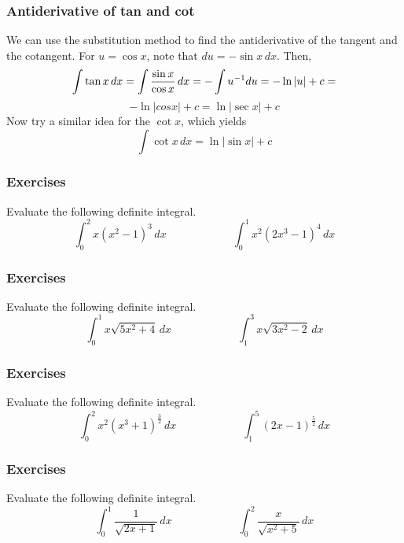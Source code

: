 \documentclass[xcolor=dvipsnames]{beamer}
\begin{document}
\begin{frame}
  \frametitle{Antiderivative of tan and cot}
We can use the substitution method to find the antiderivative of the
tangent and the cotangent. For $u=\cos{}x$, note that
$du=-\sin{}x\,dx$. Then,
\begin{equation}
  \label{eq:aibeajuh}
  \int\tan{}x\,dx=\int\frac{\sin{}x}{\cos{}x}\,dx=-\int{}u^{-1}du=-\ln{}|u|+c=\notag
\end{equation}
\begin{equation}
  \label{eq:eeroteda}
-\ln|cos{}x|+c=\ln|\sec{}x|+c
\end{equation}
Now try a similar idea for the $\cot{}x$, which yields
\begin{equation}
  \label{eq:eekahchi}
  \int{}\cot{}x\,dx=\ln|\sin{}x|+c
\end{equation}
\end{frame}


\begin{frame}
  \frametitle{Exercises}
{\ubung} Evaluate the following definite integral.
\begin{equation}
  \label{eq:mauphouw}
  \int_{0}^{2}x(x^{2}-1)^{3}\,dx\hspace{1in}\int_{0}^{1}x^{2}(2x^{3}-1)^{4}\,dx
\end{equation}
\end{frame}

\begin{frame}
  \frametitle{Exercises}
{\ubung} Evaluate the following definite integral.
\begin{equation}
  \label{eq:pahteeth}
  \int_{0}^{1}x\sqrt{5x^{2}+4}\,dx\hspace{1in}\int_{1}^{3}x\sqrt{3x^{2}-2}\,dx
\end{equation}
\end{frame}

\begin{frame}
  \frametitle{Exercises}
{\ubung} Evaluate the following definite integral.
\begin{equation}
  \label{eq:ceiquoor}
  \int_{0}^{2}x^{2}(x^{3}+1)^{\frac{3}{2}}\,dx\hspace{1in}\int_{1}^{5}(2x-1)^{\frac{5}{2}}\,dx
\end{equation}
\end{frame}

\begin{frame}
  \frametitle{Exercises}
{\ubung} Evaluate the following definite integral.
\begin{equation}
  \label{eq:riweevie}
  \int_{0}^{1}\frac{1}{\sqrt{2x+1}}\,dx\hspace{1in}\int_{0}^{2}\frac{x}{\sqrt{x^{2}+5}}\,dx
\end{equation}
\end{frame}
\end{document}
